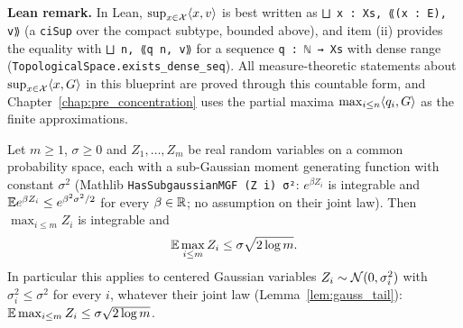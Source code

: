 \textbf{Lean remark.} In Lean, $\sup_{x\in\mathcal{X}}\langle x, v \rangle$ is best written as
\texttt{⨆ x : Xs, ⟪(x : E), v⟫} (a \texttt{ciSup} over the compact subtype, bounded above),
and item (ii) provides the equality with \texttt{⨆ n, ⟪q n, v⟫} for a sequence
\texttt{q : ℕ → Xs} with dense range (\texttt{TopologicalSpace.exists\_dense\_seq}). All
measure-theoretic statements about $\sup_{x\in\mathcal{X}}\langle x, G \rangle$ in this blueprint are proved
through this countable form, and Chapter~\ref{chap:pre_concentration} uses the partial maxima
$\max_{i\le n}\langle q_i, G \rangle$ as the finite approximations.

\begin{lemma}\label{lem:gauss_max_upper}
\leanok
{}
Let $m \ge 1$, $\sigma \ge 0$ and $Z_1,\dots,Z_m$ be real random variables on a common
probability space, each with a sub-Gaussian moment generating function with constant
$\sigma^2$ (Mathlib \texttt{HasSubgaussianMGF (Z i) σ²}: $e^{\beta Z_i}$ is integrable and
$\mathbb{E} e^{\beta Z_i}\le e^{\beta^2\sigma^2/2}$ for every $\beta\in\mathbb{R}$; no assumption on their
joint law). Then $\max_{i\le m}Z_i$ is integrable and
\[
  \mathbb{E}\max_{i\le m}Z_i \le \sigma\sqrt{2\log m}.
\]
In particular this applies to centered Gaussian variables $Z_i \sim \mathcal{N}(0,\sigma_i^2)$
with $\sigma_i^2 \le \sigma^2$ for every $i$, whatever their joint law
(Lemma~\ref{lem:gauss_tail}): $\mathbb{E}\max_{i\le m}Z_i \le \sigma\sqrt{2\log m}$.
\end{lemma}

